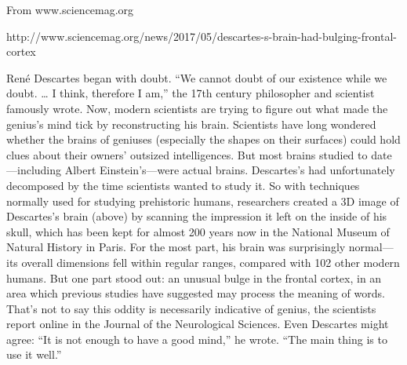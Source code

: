 From www.sciencemag.org

http://www.sciencemag.org/news/2017/05/descartes-s-brain-had-bulging-frontal-cortex

René Descartes began with doubt. “We cannot 
doubt of our existence while we doubt. … 
I think, therefore I am,” the 17th century 
philosopher and scientist famously wrote. Now, 
modern scientists are trying to figure out what made the 
genius’s mind tick by reconstructing his brain. Scientists 
have long wondered whether the brains of geniuses 
(especially the shapes on their surfaces) could hold 
clues about their owners’ outsized intelligences. But most 
brains studied to date—including Albert Einstein’s—were actual 
brains. Descartes’s had unfortunately decomposed by the time 
scientists wanted to study it. So with techniques normally used 
for studying prehistoric humans, researchers created a 3D image of 
Descartes’s brain (above) by scanning the impression it left 
on the inside of his skull, which has been kept for almost 200 
years now in the National Museum of Natural History in Paris. 
For the most part, his brain was surprisingly normal—its overall 
dimensions fell within regular ranges, compared with 102 other modern 
humans. But one part stood out: an unusual bulge in the frontal cortex, 
in an area which previous studies have suggested may 
process the meaning of words. That’s not to say 
this oddity is necessarily indicative of genius, 
the scientists report online in the Journal of the 
Neurological Sciences. Even Descartes might agree: “It 
is not enough to have a good mind,” he wrote. 
“The main thing is to use it well.”
